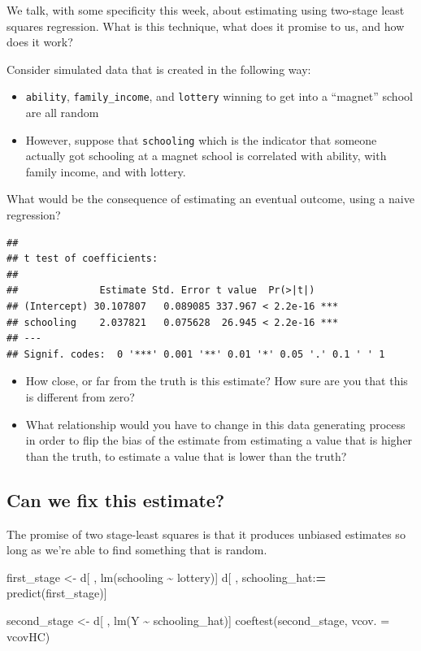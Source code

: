\documentclass[
]{article}
\newenvironment{Shaded}{\begin{snugshade}}{\end{snugshade}}
\newcommand{\AttributeTok}[1]{\textcolor[rgb]{0.77,0.63,0.00}{#1}}
\newcommand{\ErrorTok}[1]{\textcolor[rgb]{0.64,0.00,0.00}{\textbf{#1}}}
\newcommand{\FunctionTok}[1]{\textcolor[rgb]{0.00,0.00,0.00}{#1}}
\newcommand{\NormalTok}[1]{#1}
\newcommand{\OtherTok}[1]{\textcolor[rgb]{0.56,0.35,0.01}{#1}}
\newcommand{\SpecialCharTok}[1]{\textcolor[rgb]{0.00,0.00,0.00}{#1}}
\providecommand{\tightlist}{%
  \setlength{\itemsep}{0pt}\setlength{\parskip}{0pt}}
\begin{document}
We talk, with some specificity this week, about estimating using two-stage least squares regression. What is this technique, what does it promise to us, and how does it work?

Consider simulated data that is created in the following way:

\begin{itemize}
\tightlist
\item
  \texttt{ability}, \texttt{family\_income}, and \texttt{lottery} winning to get into a ``magnet'' school are all random
\item
  However, suppose that \texttt{schooling} which is the indicator that someone actually got schooling at a magnet school is correlated with ability, with family income, and with lottery.
\end{itemize}

What would be the consequence of estimating an eventual outcome, using a naive regression?

\begin{verbatim}
## 
## t test of coefficients:
## 
##              Estimate Std. Error t value  Pr(>|t|)    
## (Intercept) 30.107807   0.089085 337.967 < 2.2e-16 ***
## schooling    2.037821   0.075628  26.945 < 2.2e-16 ***
## ---
## Signif. codes:  0 '***' 0.001 '**' 0.01 '*' 0.05 '.' 0.1 ' ' 1
\end{verbatim}

\begin{itemize}
\tightlist
\item
  How close, or far from the truth is this estimate? How sure are you that this is different from zero?
\item
  What relationship would you have to change in this data generating process in order to flip the bias of the estimate from estimating a value that is higher than the truth, to estimate a value that is lower than the truth?
\end{itemize}

\hypertarget{can-we-fix-this-estimate}{%
\subsection{Can we fix this estimate?}\label{can-we-fix-this-estimate}}

The promise of two stage-least squares is that it produces unbiased estimates so long as we're able to find something that is random.

\begin{Shaded}
\begin{Highlighting}[]
\NormalTok{first\_stage }\OtherTok{\textless{}{-}}\NormalTok{ d[ , }\FunctionTok{lm}\NormalTok{(schooling }\SpecialCharTok{\textasciitilde{}}\NormalTok{ lottery)] }
\NormalTok{d[ , schooling\_hat}\SpecialCharTok{:}\ErrorTok{=} \FunctionTok{predict}\NormalTok{(first\_stage)] }

\NormalTok{second\_stage }\OtherTok{\textless{}{-}}\NormalTok{ d[ , }\FunctionTok{lm}\NormalTok{(Y }\SpecialCharTok{\textasciitilde{}}\NormalTok{ schooling\_hat)]}
\FunctionTok{coeftest}\NormalTok{(second\_stage, }\AttributeTok{vcov. =}\NormalTok{ vcovHC)}
\end{Highlighting}
\end{Shaded}
\end{document}
